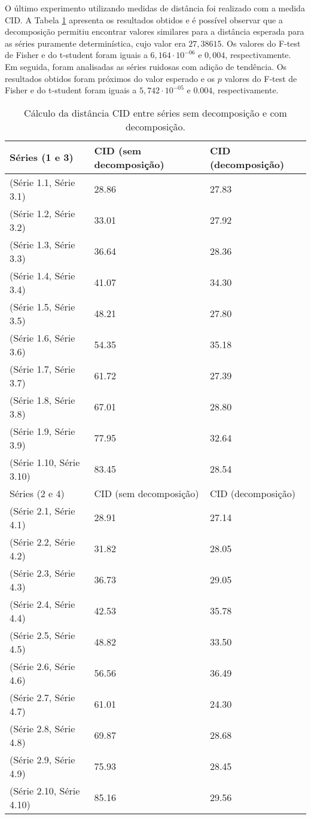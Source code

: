 O último experimento utilizando medidas de distância foi realizado com a medida CID. A Tabela \ref{CID} apresenta os resultados obtidos e é possível observar que a decomposição permitiu encontrar valores similares para a distância esperada para as séries puramente determinística, cujo valor era $27,38615$. Os valores do F-test de Fisher e do t-student foram iguais a $6,164 \cdot 10^{-06}$ e $0,004$, respectivamente. Em seguida, foram analisadas as séries ruidosas com adição de tendência. Os resultados obtidos foram próximos do valor esperado e os $p$ valores do F-test de Fisher e do t-student foram iguais a $5,742 \cdot 10^{-05}$ e $0.004$, respectivamente.

\begin{table}[!ht]
\centering
\caption{Cálculo da distância CID entre séries sem decomposição e com decomposição.}
\begin{tabular}{lll}
 \hline
Séries (1 e 3) & CID (sem decomposição) & CID (decomposição) \\
 \hline
(Série 1.1, Série 3.1)  & 28.86 & 27.83 \\ 
(Série 1.2, Série 3.2)  &  33.01 & 27.92 \\
(Série 1.3, Série 3.3)  & 36.64 & 28.36 \\ 
(Série 1.4, Série 3.4)  &  41.07 & 34.30 \\ 
(Série 1.5, Série 3.5)  & 48.21 & 27.80  \\
(Série 1.6, Série 3.6)  & 54.35 & 35.18 \\
(Série 1.7, Série 3.7)  & 61.72 & 27.39 \\ 
(Série 1.8, Série 3.8)  & 67.01 & 28.80 \\
(Série 1.9, Série 3.9)  & 77.95 & 32.64 \\ 
(Série 1.10, Série 3.10)  & 83.45 & 28.54 \\
\hline
Séries (2 e 4) & CID (sem decomposição) & CID (decomposição) \\
\hline
\hline
(Série 2.1, Série 4.1) & 28.91  & 27.14\\ 
(Série 2.2, Série 4.2) & 31.82 &  28.05 \\ 
(Série 2.3, Série 4.3) & 36.73 & 29.05 \\
(Série 2.4, Série 4.4) & 42.53 & 35.78 \\ 
(Série 2.5, Série 4.5) & 48.82 & 33.50 \\
(Série 2.6, Série 4.6) & 56.56 & 36.49 \\
(Série 2.7, Série 4.7) & 61.01 & 24.30 \\ 
(Série 2.8, Série 4.8) & 69.87 & 28.68 \\
(Série 2.9, Série 4.9) & 75.93 & 28.45 \\
(Série 2.10, Série 4.10) & 85.16 & 29.56 \\ 
\hline
\end{tabular}
\label{CID}
\end{table}

